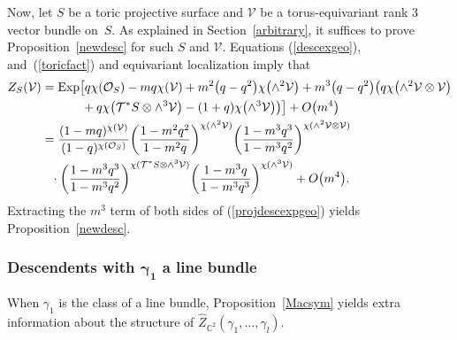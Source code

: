 \documentclass[10pt,a4paper]{amsart}
\numberwithin{equation}{section}
\newcommand{\Exp}{\mathrm{Exp}}
\def\C{\mathbb C}
\begin{document}
Now, let $S$ be a toric projective surface and $\mathcal{V}$ be a torus-equivariant rank 3 vector bundle on~$S$. As explained in Section~\ref{arbitrary}, it suffices to prove Proposition~\ref{newdesc} for such $S$ and $\mathcal{V}$. Equations (\ref{descexgeo}), and~(\ref{toricfact}) and equivariant localization imply that
\begin{align}
Z_{S}(\mathcal{V})&=\Exp\big[ q\chi(\mathcal{O}_S)-mq\chi(\mathcal{V})+m^2\big(q-q^2\big)\chi\big({\wedge}^2\mathcal{V}\big)+m^3\big(q-q^2\big) \big(q\chi\big({\wedge}^2\mathcal{V}\otimes \mathcal{V}\big)\nonumber
\\
&\hphantom{=\Exp\big[}+q\chi\big(\mathcal{T}^*S\otimes\wedge^3\mathcal{V}\big) -(1+q)\chi\big({\wedge}^3\mathcal{V}\big)\big)\big]+ O\big(m^4\big) \nonumber
\\
&=\frac{(1-mq)^{\chi(\mathcal{V})}}{(1-q)^{\chi(\mathcal{O}_S )}}\bigg(\frac{1-m^2q^2}{1-m^2q}\bigg)^{\chi(\wedge^2\mathcal{V})}\nonumber
\bigg(\frac{1-m^3q^3}{1-m^3q^2}\bigg)^{\chi(\wedge^2\mathcal{V}\otimes\mathcal{V})}
\\
&\phantom{=}\cdot\bigg(\frac{1-m^3q^3}{1-m^3q^2}\bigg)^{\chi(\mathcal{T}^*S\otimes \wedge^3\mathcal{V})}\bigg(\frac{1-m^3q}{1-m^3q^3}\bigg)^{\chi(\wedge^3\mathcal{V})}+O\big(m^4\big) .
\label{projdescexpgeo}
\end{align}
Extracting the $m^3$ term of both sides of (\ref{projdescexpgeo}) yields Proposition~\ref{newdesc}.


\subsubsection[Descendents with gamma\_1 a line bundle]{Descendents with $\boldsymbol{\gamma_1}$ a line bundle}\label{lbdescpf}

When $\gamma_1$ is the class of a line bundle, Proposition~\ref{Macsym} yields extra information about the structure of $\hat{Z}_{\C^2}(\gamma_1,\dots,\gamma_l)$.
\end{document}
